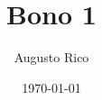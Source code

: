 \documentclass{article}
\title{Bono 1}
\author{Augusto Rico}
\date{\today}
\begin{document}
\section{}
\subsection{}
\end{document}
